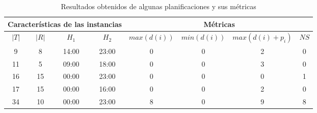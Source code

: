 \begin{table*}
\centering
\begin{tabular}{cccccccc}
\toprule
\multicolumn{4}{c}{Características de las instancias} & \multicolumn{4}{c}{Métricas} \\
\midrule
$|T|$ & $|R|$ & $H_1$ & $H_2$ & $max(d(i))$ & $min(d(i))$ & $max(d(i)+p_i)$ & $NS$ \\
\midrule
9 & 8 & 14:00 & 23:00 & 0 & 0 & 2 & 0\\
11 & 5 & 09:00 & 18:00 & 0 & 0 & 3 & 0\\
16 & 15 & 00:00 & 23:00 & 0 & 0 & 0 & 1\\
17 & 15 & 00:00 & 16:00 & 0 & 0 & 2 & 0\\
34 & 10 & 00:00 & 23:00 & 8 & 0 & 9 & 8\\
\bottomrule
\end{tabular}
\caption{Resultados obtenidos de algunas planificaciones y sus métricas}
\label{evaluacion}
\end{table*}

